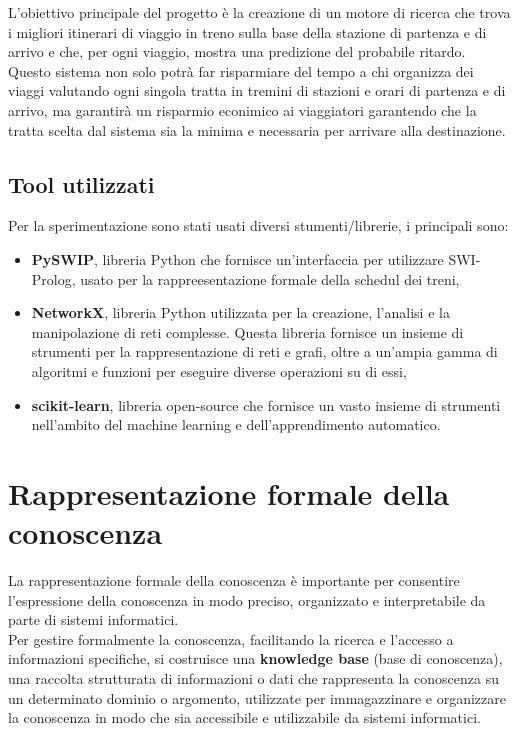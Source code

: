\documentclass[italian,12pt,a4paper]{article}
\begin{document}
	L'obiettivo principale del progetto è la creazione di un motore di ricerca che trova i migliori itinerari di viaggio in treno sulla base della stazione di partenza e di arrivo e che, per ogni viaggio, mostra una predizione del probabile ritardo.\\
	Questo sistema non solo potrà far risparmiare del tempo a chi organizza dei viaggi valutando ogni singola tratta in tremini di stazioni e orari di partenza e di arrivo, ma garantirà un risparmio econimico ai viaggiatori garantendo che la tratta scelta dal sistema sia la minima e necessaria per arrivare alla destinazione. 
	
	
	\subsection{Tool utilizzati}
	Per la sperimentazione sono stati usati diversi stumenti/librerie, i principali sono:
	
		\begin{itemize}
			\item \textbf{PySWIP}, libreria Python che fornisce un'interfaccia per utilizzare SWI-Prolog, usato per la rappreesentazione formale della schedul dei treni,
			\item \textbf{NetworkX}, libreria Python utilizzata per la creazione, l'analisi e la manipolazione di reti complesse. Questa libreria fornisce un insieme di strumenti per la rappresentazione di reti e grafi, oltre a un'ampia gamma di algoritmi e funzioni per eseguire diverse operazioni su di essi,
			\item \textbf{scikit-learn}, libreria open-source che fornisce un vasto insieme di strumenti nell'ambito del machine learning e dell'apprendimento automatico.
		\end{itemize}

	\section{Rappresentazione formale della conoscenza}
	
	La rappresentazione formale della conoscenza è importante per consentire l'espressione della conoscenza in modo preciso, organizzato e interpretabile da parte di sistemi informatici.\\
	Per gestire formalmente la conoscenza, facilitando la ricerca e l'accesso a informazioni specifiche, si costruisce una \textbf{knowledge base} (base di conoscenza), una raccolta strutturata di informazioni o dati che rappresenta la conoscenza su un determinato dominio o argomento, utilizzate per immagazzinare e organizzare la conoscenza in modo che sia accessibile e utilizzabile da sistemi informatici.
	
\end{document}
